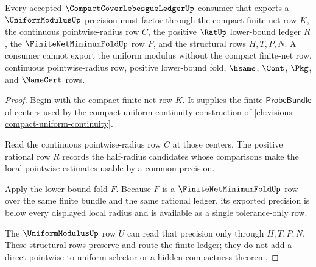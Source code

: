 \begin{theorem}
\label{thm:compact-cover-lebesgue-ledger-uniform-modulus-handoff}
Every accepted $\CompactCoverLebesgueLedgerUp$ consumer that exports a $\UniformModulusUp$ precision must factor through the compact finite-net row $K$, the continuous pointwise-radius row $C$, the positive $\RatUp$ lower-bound ledger $R$, the $\FiniteNetMinimumFoldUp$ row $F$, and the structural rows $H,T,P,N$. A consumer cannot export the uniform modulus without the compact finite-net row, continuous pointwise-radius row, positive lower-bound fold, $\hsame$, $\Cont$, $\Pkg$, and $\NameCert$ rows.
\end{theorem}
\begin{proof}
Begin with the compact finite-net row $K$. It supplies the finite $\mathsf{ProbeBundle}$ of centers used by the compact-uniform-continuity construction of \autoref{ch:visions-compact-uniform-continuity}.

Read the continuous pointwise-radius row $C$ at those centers. The positive rational row $R$ records the half-radius candidates whose comparisons make the local pointwise estimates usable by a common precision.

Apply the lower-bound fold $F$. Because $F$ is a $\FiniteNetMinimumFoldUp$ row over the same finite bundle and the same rational ledger, its exported precision is below every displayed local radius and is available as a single tolerance-only row.

The $\UniformModulusUp$ row $U$ can read that precision only through $H,T,P,N$. These structural rows preserve and route the finite ledger; they do not add a direct pointwise-to-uniform selector or a hidden compactness theorem.
\end{proof}

